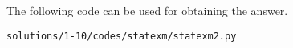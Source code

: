 %	
The following code can be used for obtaining the answer.\begin{lstlisting}
solutions/1-10/codes/statexm/statexm2.py
\end{lstlisting}
